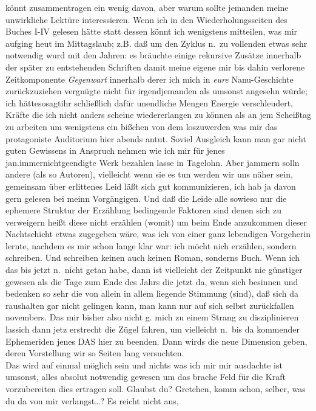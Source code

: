 \documentclass[
]{article}
\begin{document}
könnt zusammentragen ein wenig davon, aber warum sollte jemanden meine
unwirkliche Lektüre interessieren. Wenn ich in den Wiederholungsseiten
des Buches I-IV gelesen hätte statt dessen könnt ich wenigstens
mitteilen, was mir aufging heut im Mittagslaub; z.B. daß um den Zyklus
n.~zu vollenden etwas sehr notwendig wurd mit den Jahren: es bräuchte
einige rekursive Zusätze innerhalb der später zu entstehenden Schriften
damit meine eigene mir bis dahin verlorene Zeitkomponente
\emph{Gegenwart} innerhalb derer ich mich in \emph{eure} Nanu-Geschichte
zurückzuziehen vergnügte nicht für irgendjemanden als umsonst angesehn
würde; ich hättesosagtihr schließlich dafür unendliche Mengen Energie
verschleudert, Kräfte die ich nicht anders scheine wiedererlangen zu
können als an jem Scheißtag zu arbeiten um wenigstens ein bißchen von
dem loszuwerden was mir das protagoniste Auditorium hier abends antut.
Soviel Ausgleich kann man gar nicht guten Gewissens in Anspruch nehmen
wie ich mir für jenes jan.immernichtgeendigte Werk bezahlen lasse in
Tagelohn. Aber jammern solln andere (als so Autoren), vielleicht wenn
sie es tun werden wir uns näher sein, gemeinsam über erlittenes Leid
läßt sich gut kommunizieren, ich hab ja davon gern gelesen bei meinn
Vorgängigen. Und daß die Leide alle sowieso nur die ephemere Struktur
der Erzählung bedingende Faktoren sind denen sich zu verweigern heißt
diese nicht erzählen (womit) um beim Ende anzukommen dieser Nachtschicht
etwas zugegeben wäre, was ich von einer ganz lebendigen Vorgeherin
lernte, nachdem es mir schon lange klar war: ich möcht nich erzählen,
sondern schreiben. Und schreiben keinen auch keinen Roman, sonderns
Buch. Wenn ich das bis jetzt n.~nicht getan habe, dann ist vielleicht
der Zeitpunkt nie günstiger gewesen als die Tage zum Ende des Jahrs die
jetzt da, wenn sich besinnen und bedenken so sehr die von allein in
allem liegende Stimmung (sind), daß sich da raushalten gar nicht
gelingen kann, man kann nur auf sich selbst zurückfallen novembers.
Da\textquotesingle s mir bisher also nicht g. mich zu einem Strang zu
disziplinieren lassich dann jetz erstrecht die Zügel fahren, um
vielleicht n.~bis da kommender Ephemeriden jenes DAS hier zu beenden.
Dann wirds die neue Dimension geben, deren Vorstellung wir so Seiten
lang versuchten.\\
Das wird auf einmal möglich sein und nichts was ich mir mir ausdachte
ist umsonst, alles absolut notwendig gewesen um das brache Feld für die
Kraft vorzubereiten dies ertragen soll. Glaubst du? Gretchen, komm
schon, selber, was du da von mir verlangst\ldots? Es reicht nicht aus,
\end{document}
